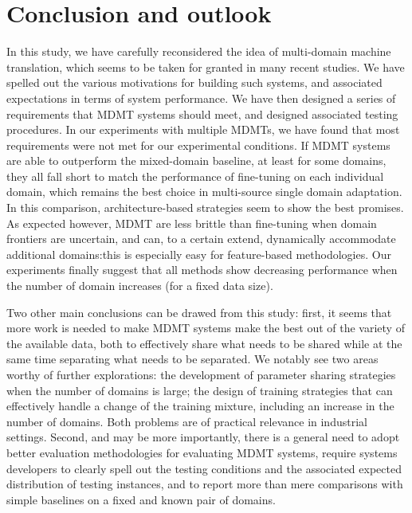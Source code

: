 \documentclass[11pt,a4paper]{article}
\newcommand{\fyTodo}[1]{\Todo[FY:]{\textcolor{orange}{#1}}}
\newcommand{\fyDone}[1]{\done[FY]\Todo[FY:]{\textcolor{orange}{#1}}}
\begin{document}
\section{Conclusion and outlook \label{sec:conclusion}}
\fyDone{Write conclusions}
In this study, we have carefully reconsidered the idea of multi-domain machine translation, which seems to be taken for granted in many recent studies. We have spelled out the various motivations for building such systems, and associated expectations in terms of system performance. We have then designed a series of requirements that MDMT systems should meet, and designed associated testing procedures. In our experiments with multiple MDMTs, we have found that most requirements were not met for our experimental conditions. If MDMT systems are able to outperform the mixed-domain baseline, at least for some domains, they all fall short to match the performance of fine-tuning on each individual domain, which remains the best choice in multi-source single domain adaptation. In this comparison, architecture-based strategies seem to show the best promises. \fyTodo{Mitigate this}
As expected however, MDMT are less brittle than fine-tuning when domain frontiers are uncertain, and can, to a certain extend,
dynamically accommodate additional domains:this is especially easy for feature-based methodologies. Our experiments finally suggest that all methods show decreasing performance when the number of domain increases (for a fixed data size). 

Two other main conclusions can be drawed from this study: first, it seems that more work is needed to make MDMT systems make the best out of the variety of the available data, both to effectively share what needs to be shared while at the same time separating what needs to be separated. We notably see two areas worthy of further explorations: the development of parameter sharing strategies when the number of domains is large; the design of training strategies that can effectively handle a change of the training mixture, including an increase in the number of domains. Both problems are of practical relevance in industrial settings. Second, and may be more importantly, there is a general need to adopt better evaluation methodologies for evaluating MDMT systems, require systems developers to clearly spell out the testing conditions and the associated expected distribution of testing instances, and to report more than mere comparisons with simple baselines on a fixed and known pair of domains.


% 



\todos{}
\end{document}
